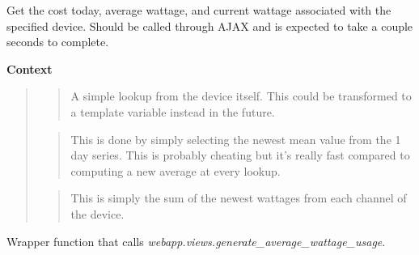 \documentclass[letterpaper,10pt,english]{sphinxmanual}
\begin{document}
\begin{fulllineitems}
\label{modules/webapp:webapp.views.generate_average_wattage_usage}
Get the cost today, average wattage, and current wattage associated with the specified device.
Should be called through AJAX and is expected to take a couple seconds to complete.

\textbf{Context}
\begin{quote}

\begin{quote}

A simple lookup from the device itself. This could be transformed to a template
variable instead in the future.
\end{quote}

\begin{quote}

This is done by simply selecting the newest mean value from the 1 day series. This
is probably cheating but it's really fast compared to computing a new average
at every lookup.
\end{quote}

\begin{quote}

This is simply the sum of the newest wattages from each channel of the device.
\end{quote}
\end{quote}

\end{fulllineitems}


\begin{fulllineitems}
\label{modules/webapp:webapp.views.generate_heatmap_data}
\end{fulllineitems}


\begin{fulllineitems}
\label{modules/webapp:webapp.views.get_wattage_usage}
Wrapper function that calls \emph{webapp.views.generate\_average\_wattage\_usage}.

\end{fulllineitems}
\end{document}
